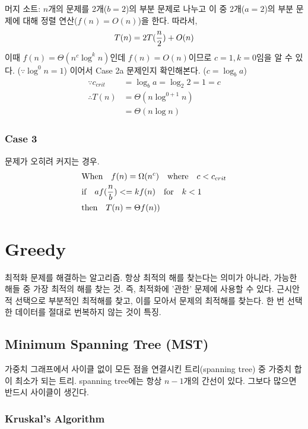 머지 소트: $n$개의 문제를 2개($b = 2$)의 부분 문제로 나누고 이 중 2개($a = 2$)의 부분 문제에 대해 정렬 연산($f(n) = O(n)$)을 한다. 따라서,
$$
T(n) = 2T({n \over 2}) + O(n)
$$
이때 $f(n) = \Theta({n^c \log^k n})$인데 $f(n) = O(n)$이므로 $c = 1, k = 0$임을 알 수 있다. ($\because \log^0{n} = 1$) 이어서 Case 2a 문제인지 확인해본다. ($c = \log_b{a}$)
$$
\begin{aligned}
  \because c_{crit} &= \log_b{a} = \log_2{2} = 1 = c \\
  \therefore T(n) &= \Theta(n \log^{0 + 1}{n}) \\
  &= \Theta(n \log n)
\end{aligned}
$$

\subsubsection{Case 3}

문제가 오히려 커지는 경우.
$$
\begin{aligned}
  &\text{When} \quad f(n) = \Omega(n^c) \quad \text{where} \quad c < c_{crit} \\
  &\text{if} \quad af({n \over b}) <= kf(n) \quad \text{for} \quad k < 1 \\
  &\text{then} \quad T(n) = \Theta{f(n))}
\end{aligned}
$$

\section{Greedy}

최적화 문제를 해결하는 알고리즘. 항상 최적의 해를 찾는다는 의미가 아니라, 가능한 해들 중 가장 최적의 해를 찾는 것. 즉, 최적화에 '관한' 문제에 사용할 수 있다. 근시안적 선택으로 부분적인 최적해를 찾고, 이를 모아서 문제의 최적해를 찾는다. 한 번 선택한 데이터를 절대로 번복하지 않는 것이 특징.

\subsection{Minimum Spanning Tree (MST)}

가중치 그래프에서 사이클 없이 모든 점을 연결시킨 트리(spanning tree) 중 가중치 합이 최소가 되는 트리. spanning tree에는 항상 $n - 1$개의 간선이 있다. 그보다 많으면 반드시 사이클이 생긴다.

\subsubsection{Kruskal's Algorithm}

